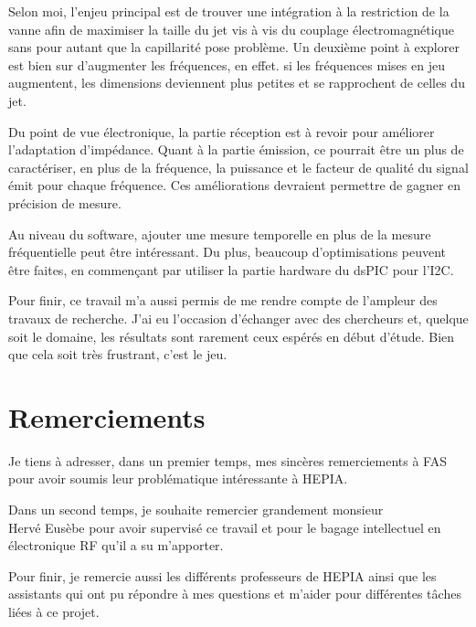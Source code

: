 \documentclass[12pt]{article}
\begin{document}
\vspace{0.5cm}
Selon moi, l'enjeu principal est de trouver une intégration à la restriction de la vanne afin de maximiser la taille du jet vis à vis du couplage électromagnétique sans pour autant que la capillarité pose problème. Un deuxième point à explorer est bien sur d'augmenter les fréquences, en effet. si les fréquences mises en jeu augmentent, les dimensions deviennent plus petites et se rapprochent de celles du jet.

\vspace{0.5cm}
Du point de vue électronique, la partie réception est à revoir pour améliorer l’adaptation d’impédance. Quant à la partie émission, ce pourrait être un plus de caractériser, en plus de la fréquence, la puissance et le facteur de qualité du signal émit pour chaque fréquence. Ces améliorations devraient permettre de gagner en précision de mesure. 

\vspace{0.5cm}
Au niveau du software, ajouter une mesure temporelle en plus de la mesure fréquentielle peut être intéressant. Du plus, beaucoup d'optimisations peuvent être faites, en commençant par utiliser la partie hardware du dsPIC pour l'I2C.

\vspace{0.5cm}
Pour finir, ce travail m'a aussi permis de me rendre compte de l’ampleur des travaux de recherche. J'ai eu l'occasion d’échanger avec des chercheurs et, quelque soit le domaine, les résultats sont rarement ceux espérés en début d'étude. Bien que cela soit très frustrant, c'est le jeu. 

\newpage
\section{Remerciements}

Je tiens à adresser, dans un premier temps, mes sincères remerciements à FAS pour avoir soumis leur problématique intéressante à HEPIA. 

\vspace{0.5cm}
Dans un second temps, je souhaite remercier grandement monsieur\\ Hervé Eusèbe pour avoir supervisé ce travail et pour le bagage intellectuel en électronique RF qu'il a su m'apporter.

\vspace{0.5cm}
Pour finir, je remercie aussi les différents professeurs de HEPIA ainsi que les assistants qui ont pu répondre à mes questions et m'aider pour différentes tâches liées à ce projet.
\end{document}

